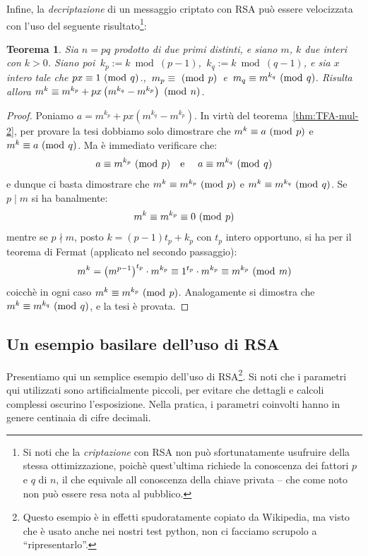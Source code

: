 \documentclass[pdflatex,11pt,a4paper,oneside]{article}
\let\OldEmph\emph
\renewcommand{\emph}[1]{\OldEmph{#1\/}}
\newcommand{\p}[1]{\left({#1}\right)}
\newcommand{\divides}[0]{\mid}
\newcommand{\notdivides}[0]{\nmid}
\newcommand{\congruent}[0]{\equiv}
\newcommand{\mmodop}[0]{\ensuremath{\operatorname{mod}}}
\newcommand{\mmod}[1]{\ensuremath{\allowbreak\ (\mmodop\:{#1})}}
\newcommand{\rem}[2]{\ensuremath{{#1}\:\mmodop\:{#2}}}
\newtheorem{theorem}[TheoremLike]{Teorema}
\begin{document}
\medskip\noindent
Infine, la \emph{decriptazione} di un messaggio criptato con RSA pu\`o
essere velocizzata con l'uso del seguente risultato\footnote{Si noti che
la \emph{criptazione} con RSA non pu\`o sfortunatamente usufruire della
stessa ottimizzazione, poich\`e quest'ultima richiede la conoscenza dei
fattori $p$ e $q$ di $n$, il che equivale all conoscenza della chiave
privata -- che come noto non pu\`o essere resa nota al pubblico.}:
%
\begin{theorem}
Sia $n = pq$ prodotto di due primi distinti, e siano $m$, $k$ due
interi con $k > 0$.  Siano poi \,$k_p := \rem{k}{(p-1)}$,
\,$k_q := \rem{k}{(q-1)}$, e sia $x$ intero tale che
$px \congruent 1 \mmod q$., \,$m_p \congruent  \mmod p$\,
e \,$m_q \congruent m^{k_q} \mmod q$. Risulta allora
$m^k \congruent m^{k_p} + px\p{m^{k_q} - m^{k_p}}\mmod n$.
\end{theorem}
%
\begin{proof}
Poniamo $a = m^{k_p} + px\p{m^{k_q} - m^{k_p}}$.  In virt\`u del
teorema~\eqref{thm:TFA-mul-2}, per provare la tesi dobbiamo solo
dimostrare che $m^k \congruent a \mmod p$ e $m^k \congruent a \mmod q$.
Ma \`e immediato verificare che:
\begin{displaymath}
  a \congruent m^{k_p} \mmod p
    \text{\quad e \quad}
  a \congruent m^{k_q} \mmod q
\end{displaymath}
e dunque ci basta dimostrare che $m^k \congruent m^{k_p} \mmod p$ e
$m^k \congruent m^{k_q} \mmod q$. Se $p \divides m$ si ha banalmente:
\begin{displaymath}
  m^k \congruent m^{k_p} \congruent 0 \mmod p
\end{displaymath}
mentre se $p \notdivides m$, posto $k = (p - 1)t_p + k_p$ con $t_p$ intero
opportuno, si ha per il teorema di Fermat (applicato nel secondo
passaggio):
\begin{displaymath}
  m^k = \p{m^{p-1}}^{t_p} \cdot m^{k_p} \congruent 1^{t_p} \cdot m^{k_p}
      \congruent m^{k_p} \mmod m
\end{displaymath}
coicch\`e in ogni caso $m^k \congruent m^{k_p} \mmod p$. Analogamente si
dimostra che $m^k \congruent m^{k_q} \mmod q$, e la tesi \`e provata.
\end{proof}

\subsection{Un esempio basilare dell'uso di RSA}

Presentiamo qui un semplice esempio dell'uso di RSA\footnote{Questo
esempio \`e in effetti spudoratamente copiato da Wikipedia, ma visto
che \`e usato anche nei nostri test python, non ci facciamo scrupolo
a ``ripresentarlo''.}. Si noti che i parametri qui utilizzati sono
artificialmente piccoli, per evitare che dettagli e calcoli complessi
oscurino l'esposizione. Nella pratica, i parametri coinvolti hanno
in genere centinaia di cifre decimali.
\end{document}
